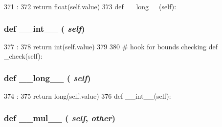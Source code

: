 \begin{DoxyCode}
371                        :
372         return float(self.value)
373 
    def __long__(self):
\end{DoxyCode}
\hypertarget{classm5_1_1params_1_1NumericParamValue_a28a958e3c802a3137bcf4b44d5cef95c}{
\subsubsection[{\_\-\_\-int\_\-\_\-}]{\setlength{\rightskip}{0pt plus 5cm}def \_\-\_\-int\_\-\_\- ( {\em self})}}
\label{classm5_1_1params_1_1NumericParamValue_a28a958e3c802a3137bcf4b44d5cef95c}



\begin{DoxyCode}
377                      :
378         return int(self.value)
379 
380     # hook for bounds checking
    def _check(self):
\end{DoxyCode}
\hypertarget{classm5_1_1params_1_1NumericParamValue_a44b0d01b7aeedc4b3c9052a2c6ba1645}{
\subsubsection[{\_\-\_\-long\_\-\_\-}]{\setlength{\rightskip}{0pt plus 5cm}def \_\-\_\-long\_\-\_\- ( {\em self})}}
\label{classm5_1_1params_1_1NumericParamValue_a44b0d01b7aeedc4b3c9052a2c6ba1645}



\begin{DoxyCode}
374                       :
375         return long(self.value)
376 
    def __int__(self):
\end{DoxyCode}
\hypertarget{classm5_1_1params_1_1NumericParamValue_a48a7267a9f9d29d1514e713744202146}{
\subsubsection[{\_\-\_\-mul\_\-\_\-}]{\setlength{\rightskip}{0pt plus 5cm}def \_\-\_\-mul\_\-\_\- ( {\em self}, \/   {\em other})}}
\label{classm5_1_1params_1_1NumericParamValue_a48a7267a9f9d29d1514e713744202146}



